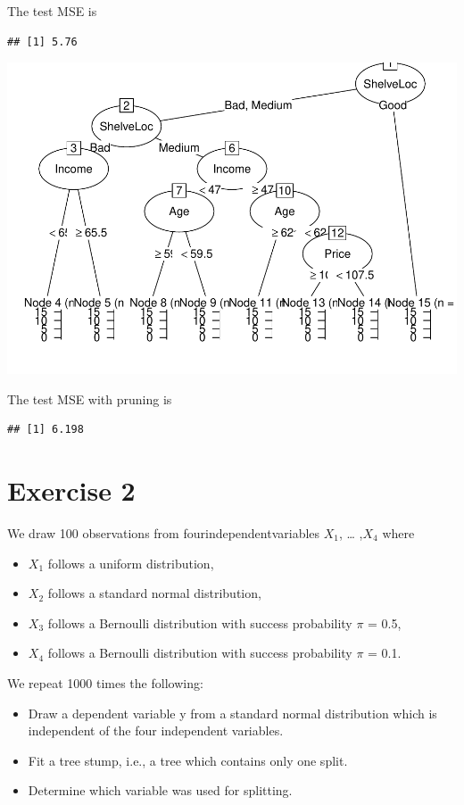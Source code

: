 \documentclass[
]{article}
\begin{document}
The test MSE is

\begin{verbatim}
## [1] 5.76
\end{verbatim}

\includegraphics{A3_files/figure-latex/unnamed-chunk-7-1.pdf}

The test MSE with pruning is

\begin{verbatim}
## [1] 6.198
\end{verbatim}

\section{Exercise 2}\label{exercise-2}

We draw 100 observations from fourindependentvariables \(X_1\), \ldots{}
,\(X_4\) where

\begin{itemize}
  \item $X_1$ follows a uniform distribution,
  \item $X_2$ follows a standard normal distribution,
  \item $X_3$ follows a Bernoulli distribution with success probability $\pi$ = 0.5,
  \item $X_4$ follows a Bernoulli distribution with success probability $\pi$ = 0.1.
\end{itemize}

We repeat 1000 times the following:

\begin{itemize}
  \item Draw a dependent variable y from a standard normal distribution which is independent of the four independent variables.
  \item Fit a tree stump, i.e., a tree which contains only one split.
  \item Determine which variable was used for splitting.
\end{itemize}
\end{document}
